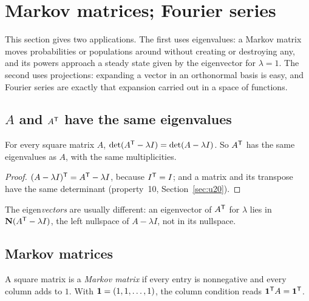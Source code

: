 \section{Markov matrices; Fourier series}\label{sec:u26}

This section gives two applications. The first uses eigenvalues: a Markov matrix moves
probabilities or populations around without creating or destroying any, and its powers
approach a steady state given by the eigenvector for $\lambda=1$. The second uses
projections: expanding a vector in an orthonormal basis is easy, and Fourier series are
exactly that expansion carried out in a space of functions.

\subsection{\texorpdfstring{\(A\)}{A} and \texorpdfstring{\(A^{\mathsf{T}}\)}{its transpose} have the same eigenvalues}

\begin{proposition}\label{prop:u26-transpose}
For every square matrix $A$, $\det(A^{\mathsf{T}}-\lambda I)=\det(A-\lambda I)$. So $A^{\mathsf{T}}$ has the same
eigenvalues as $A$, with the same multiplicities.
\end{proposition}

\begin{proof}
$(A-\lambda I)^{\mathsf{T}}=A^{\mathsf{T}}-\lambda I$, because $I^{\mathsf{T}}=I$; and a matrix and its transpose have the
same determinant (property~10, Section~\ref{sec:u20}).
\end{proof}

The eigen\emph{vectors} are usually different: an eigenvector of $A^{\mathsf{T}}$ for $\lambda$ lies in
$\mathbf{N}(A^{\mathsf{T}}-\lambda I)$, the left nullspace of $A-\lambda I$, not in its nullspace.

\subsection{Markov matrices}

\begin{definition}\label{def:u26-markov}
A square matrix is a \emph{Markov matrix} if every entry is nonnegative and every column
adds to $1$. With $\boldsymbol{1}=(1,1,\dots,1)$, the column condition reads $\boldsymbol{1}^{\mathsf{T}} A=\boldsymbol{1}^{\mathsf{T}}$.
\end{definition}

